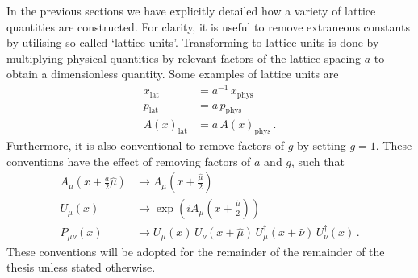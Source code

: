 In the previous sections we have explicitly detailed how a variety of lattice quantities are constructed. For clarity, it is useful to remove extraneous constants by utilising so-called `lattice units'. Transforming to lattice units is done by multiplying physical quantities by relevant factors of the lattice spacing $a$ to obtain a dimensionless quantity. Some examples of lattice units are
%
\begin{align*}
x_\text{lat} &= a^{-1}\,x_\text{phys}\\
p_\text{lat} &= a\, p_\text{phys}\\
A(x)_\text{lat} &= a\, A(x)_\text{phys}\, .
\end{align*}
%
Furthermore, it is also conventional to remove factors of $g$ by setting $g=1$. These conventions have the effect of removing factors of $a$ and $g$, such that
%
\begin{align*}
A_\mu \left( x+\frac{a}{2}\hat{\mu} \right)&\rightarrow A_\mu \left(x+\frac{\hat{\mu}}{2} \right)\\
U_\mu(x) &\rightarrow \exp\left( i A_\mu \left(x+\frac{\hat{\mu}}{2}\right)\right)\\
P_{\mu\nu}(x) &\rightarrow U_\mu(x)\,U_\nu(x+\hat{\mu})\, U_\mu^\dag(x+\hat{\nu})\, U_\nu^\dag(x)\, .
\end{align*}
%
These conventions will be adopted for the remainder of the remainder of the thesis unless stated otherwise. 

%
%
%
%
%

